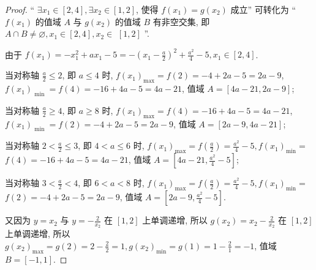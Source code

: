 \begin{proof}
  “ \(\exists {x}_{1} \in  \left\lbrack  {2, 4}\right\rbrack  , \exists {x}_{2} \in  \left\lbrack  {1, 2}\right\rbrack\), 使得 \(f\left( {x}_{1}\right)  = g\left( {x}_{2}\right)\) 成立” 可转化为 “ \(f\left( {x}_{1}\right)\) 的值域 \(A\) 与 \(g\left( {x}_{2}\right)\) 的值域 \(B\) 有非空交集, 即 \(A \cap  B \neq  \varnothing , {x}_{1} \in  \left\lbrack  {2, 4}\right\rbrack  , {x}_{2} \in\)  \(\left\lbrack  {1, 2}\right\rbrack\) ”.

由于 \(f\left( {x}_{1}\right)  =  -{x}_{1}^{2} + a{x}_{1} -5 =  -{\left( {x}_{1} -\frac{a}{2}\right) }^{2} + \frac{{a}^{2}}{4} -5, {x}_{1} \in  \left\lbrack  {2, 4}\right\rbrack\).

当对称轴 \(\frac{a}{2} \leq  2\), 即 \(a \leq  4\) 时, \(f{\left( {x}_{1}\right) }_{\max } = f\left( 2\right)  =  -4 + {2a} -5 = {2a} -9\), \(f{\left( {x}_{1}\right) }_{\text{ min }} = f\left( 4\right)  =  -{16} + {4a} -5 = {4a} -{21}\), 值域 \(A = \left\lbrack  {{4a} -{21}, {2a} -9}\right\rbrack\);

当对称轴 \(\frac{a}{2} \geq  4\), 即 \(a \geq  8\) 时, \(f{\left( {x}_{1}\right) }_{\max } = f\left( 4\right)  =  -{16} + {4a} -5 = {4a} -{21}\), \(f{\left( {x}_{1}\right) }_{\text{ min }} = f\left( 2\right)  =  -4 + {2a} -5 = {2a} -9\), 值域 \(A = \left\lbrack  {{2a} -9, {4a} -{21}}\right\rbrack\);

当对称轴 \(2 < \frac{a}{2} \leq  3\), 即 \(4 < a \leq  6\) 时, \(f{\left( {x}_{1}\right) }_{\max } = f\left( \frac{a}{2}\right)  = \frac{{a}^{2}}{4} -5, f{\left( {x}_{1}\right) }_{\min } =\)  \(f\left( 4\right)  =  -{16} + {4a} -5 = {4a} -{21}\), 值域 \(A = \left\lbrack  {{4a} -{21}, \frac{{a}^{2}}{4} -5}\right\rbrack\);

当对称轴 \(3 < \frac{a}{2} < 4\), 即 \(6 < a < 8\) 时, \(f{\left( {x}_{1}\right) }_{\max } = f\left( \frac{a}{2}\right)  = \frac{{a}^{2}}{4} -5, f{\left( {x}_{1}\right) }_{\min } =\)  \(f\left( 2\right)  =  -4 + {2a} -5 = {2a} -9\), 值域 \(A = \left\lbrack  {{2a} -9, \frac{{a}^{2}}{4} -5}\right\rbrack\).

又因为 \(y = {x}_{2}\) 与 \(y =  -\frac{2}{{x}_{2}}\) 在 \(\left\lbrack  {1, 2}\right\rbrack\) 上单调递增, 所以 \(g\left( {x}_{2}\right)  = {x}_{2} -\frac{2}{{x}_{2}}\) 在 \(\left\lbrack  {1, 2}\right\rbrack\) 上单调递增, 所以 \(g{\left( {x}_{2}\right) }_{\max } = g\left( 2\right)  = 2 -\frac{2}{2} = 1, g{\left( {x}_{2}\right) }_{\min } = g\left( 1\right)  = 1 -\frac{2}{1} =  -1\), 值域 \(B = \left\lbrack  {-1, 1}\right\rbrack\).


\end{proof}
